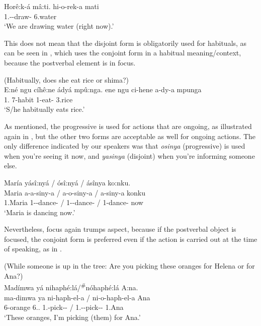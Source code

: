 \documentclass[output=paper]{langscibook}
\begin{document}
\ex
{Horê:k-á mâ:ti.    }\jambox*{[progressive]}
\gll
hi-o-rek-a  mati\\
1\PL.\SM-\PROG{}-draw-\FV{}  6.water\\
\glt
‘We are drawing water (right now).’\\

\z
\z

This does not mean that the disjoint form is obligatorily used for habituals, as can be seen in , which uses the conjoint form in a habitual meaning/context, because the postverbal element is in focus.

\ea
\label{bkm:Ref127266023}
(Habitually, does she eat rice or shima?)\\
{E:né ngu cíhê:ne ádyá mpû:nga.    }\jambox*{[conjoint]}
\gll
ene  ngu  ci-hene  a-dy-a  mpunga\\
1.\PRO{}  \PREP{}  7-habit  1\SM{}-eat-\FV{}  3.rice\\
\glt ‘S/he habitually eats rice.’

\z

As mentioned, the progressive is used for actions that are ongoing, as illustrated again in , but the other two forms are acceptable as well for ongoing actions. The only difference indicated by our speakers was that \textit{osinya} (progressive) is used when you’re seeing it now, and \textit{yasinya} (disjoint) when you’re informing someone else.

\ea
\label{bkm:Ref127266052}
María yásî:nyá / ósî:nyá / ásînya ko:nku.\\
\gll
Maria  a-a-siny-a  / a-o-siny-a   / a-siny-a  konku\\
1.Maria  1\SM{}-\DJ{}-dance-\FV{}  / 1\SM{}-\PROG{}-dance-\FV{} /   1\SM{}-dance-\FV{}  now\\
\glt
‘Maria is dancing now.’\\

\z

Nevertheless, focus again trumps aspect, because if the postverbal object is focused, the conjoint form is preferred even if the action is carried out at the time of speaking, as in .

\ea
\label{bkm:Ref127267122}
(While someone is up in the tree: Are you picking these oranges for Helena or for Ana?)\\
Madímwa yá nihaphé:lá/\textsuperscript{\#}nóhaphé:lá A:na.\\
\gll
ma-dimwa  ya  ni-haph-el-a  / ni-o-haph-el-a  Ana\\
6-orange  6.\DEM{}.\PROX{}  1\SG.\SM{}-pick-\APPL{}-\FV{}  / 1\SG.\SM{}-\PROG{}-pick-\APPL{}-\FV{}  1.Ana\\
\glt
‘These oranges, I’m picking (them) for Ana.’\\
\end{document}
